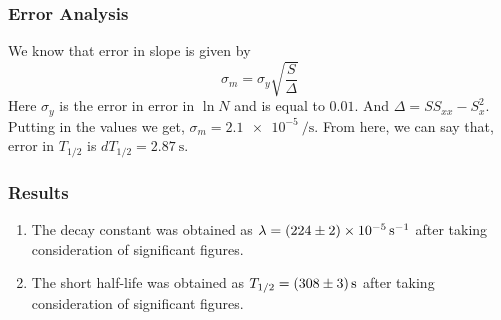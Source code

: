 \documentclass[%
 reprint,
nofootinbib,
 amsmath,amssymb,
 aps,
floatfix,
]{revtex4-2}
\begin{document}
        \subsubsection{Error Analysis}
        We know that error in slope is given by
        \begin{equation}
            \sigma_m = \sigma_y \sqrt{\dfrac{S}{\Delta}}
        \end{equation}
        Here $\sigma_y$ is the error in error in $\ln N$ and is equal to $0.01$. And $\Delta = S S_{xx} - S_{x}^2$. Putting in the values we get, $\sigma_m = \SI{2.1e-5}{\per \second}$. From here, we can say that, error in $T_{1/2}$ is $dT_{1/2} = \SI{2.87}{\second}$.
        \subsubsection{Results}
        \begin{enumerate}
            \item The decay constant was obtained as $\lambda = \SI[separate-uncertainty=true]{224 \pm 2e-5}{\per \second}$ after taking consideration of significant figures.
            \item The short half-life was obtained as $T_{1/2} = \SI[separate-uncertainty=true]{308 \pm 3}{\second}$ after taking consideration of significant figures.
        \end{enumerate}
\end{document}
